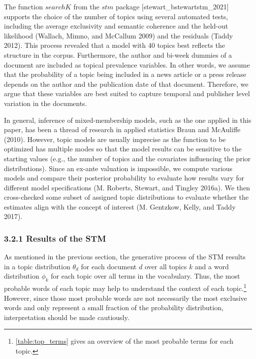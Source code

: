\documentclass[
  12pt,
]{article}
\begin{document}
The function \(searchK\) from the \(stm\) package
{[}stewart\_bstewartstm\_2021{]} supports the choice of the number of
topics using several automated tests, including the average exclusivity
and semantic coherence and the held-out likelihood (Wallach, Mimno, and
McCallum 2009) and the residuals (Taddy 2012). This process revealed
that a model with 40 topics best reflects the structure in the corpus.
Furthermore, the author and bi-week dummies of a document are included
as topical prevalence variables. In other words, we assume that the
probability of a topic being included in a news article or a press
release depends on the author and the publication date of that document.
Therefore, we argue that these variables are best suited to capture
temporal and publisher level variation in the documents.

In general, inference of mixed-membership models, such as the one
applied in this paper, has been a thread of research in applied
statistics Braun and McAuliffe (2010). However, topic models are usually
imprecise as the function to be optimized has multiple modes so that the
model results can be sensitive to the starting values (e.g., the number
of topics and the covariates influencing the prior distributions). Since
an ex-ante valuation is impossible, we compute various models and
compare their posterior probability to evaluate how results vary for
different model specifications (M. Roberts, Stewart, and Tingley 2016a).
We then cross-checked some subset of assigned topic distributions to
evaluate whether the estimates align with the concept of interest (M.
Gentzkow, Kelly, and Taddy 2017).

\hypertarget{results-of-the-stm}{%
\subsubsection{3.2.1 Results of the STM}\label{results-of-the-stm}}

As mentioned in the previous section, the generative process of the STM
results in a topic distribution \(\theta_d\) for each document \(d\)
over all topics \(k\) and a word distribution \(\phi_k\) for each topic
over all terms in the vocabulary. Thus, the most probable words of each
topic may help to understand the context of each topic.\footnote{\autoref{table:top_terms}
  gives an overview of the most probable terms for each topic.} However,
since those most probable words are not necessarily the most exclusive
words and only represent a small fraction of the probability
distribution, interpretation should be made cautiously.
\end{document}
